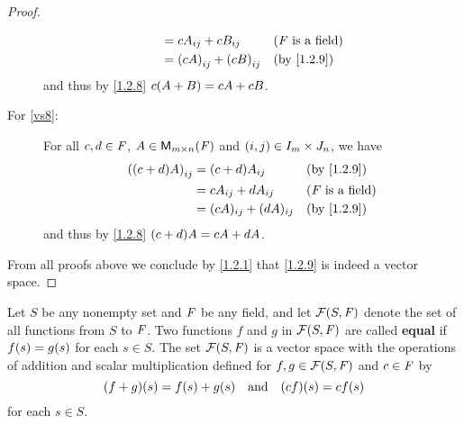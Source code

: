 \begin{proof}
\begin{description}
\begin{align*}
				                      & = c A_{i j} + c B_{i j}       &  & \text{(\(\F\) is a field)} \\
				                      & = \p{cA}_{i j} + \p{cB}_{i j} &  & \text{(by \cref{1.2.9})}
			\end{align*}
			and thus by \cref{1.2.8} \(c \p{A + B} = cA + cB\).
		\item[For \ref{vs8}:]
			For all \(c, d \in \mathit{F}\), \(A \in \mathsf{M}_{{m} \times n}({\mathit{F}})\) and \(\left\lparen i, j\right\rparen \in I_{m} \times J_{n}\), we have
			\begin{align*}
				\p{\p{c + d} A}_{i j} & = \p{c + d} A_{i j}       &  & \text{(by \cref{1.2.9})}   \\
				                      & = c A_{i j} + d A_{i j}   &  & \text{(\(\F\) is a field)} \\
				                      & = (cA)_{i j} + (dA)_{i j} &  & \text{(by \cref{1.2.9})}
			\end{align*}
			and thus by \cref{1.2.8} \(\p{c + d} A = cA + dA\).
	\end{description}
	From all proofs above we conclude by \cref{1.2.1} that \cref{1.2.9} is indeed a vector space.
\end{proof}

\begin{eg}\label{1.2.10}
	Let \(S\) be any nonempty set and \(\mathit{F}\) be any field, and let \(\FS\) denote the set of all functions from \(S\) to \(\mathit{F}\).
	Two functions \(f\) and \(g\) in \(\FS\) are called \textbf{equal} if \(f\p{s} = g\p{s}\) for each \(s \in S\).
	The set \(\FS\) is a vector space with the operations of addition and scalar multiplication defined for \(f, g \in \FS\) and \(c \in \mathit{F}\) by
	\[
		\p{f + g}\p{s} = f\p{s} + g\p{s} \quad \text{and} \quad \p{cf}\p{s} = cf\p{s}
	\]
	for each \(s \in S\).
\end{eg}

